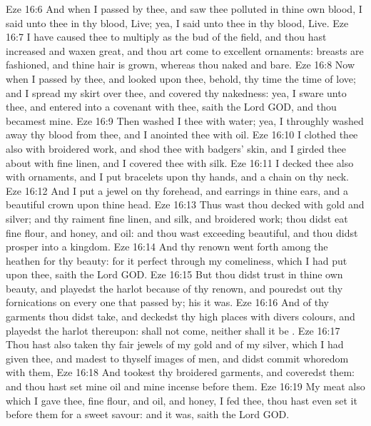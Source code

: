 \vs Eze 16:6 And when I passed by thee, and saw thee polluted in thine own blood, I said unto thee  in thy blood, Live; yea, I said unto thee  in thy blood, Live.
\vs Eze 16:7 I have caused thee to multiply as the bud of the field, and thou hast increased and waxen great, and thou art come to excellent ornaments:  breasts are fashioned, and thine hair is grown, whereas thou  naked and bare.
\vs Eze 16:8 Now when I passed by thee, and looked upon thee, behold, thy time  the time of love; and I spread my skirt over thee, and covered thy nakedness: yea, I sware unto thee, and entered into a covenant with thee, saith the Lord GOD, and thou becamest mine.
\vs Eze 16:9 Then washed I thee with water; yea, I throughly washed away thy blood from thee, and I anointed thee with oil.
\vs Eze 16:10 I clothed thee also with broidered work, and shod thee with badgers' skin, and I girded thee about with fine linen, and I covered thee with silk.
\vs Eze 16:11 I decked thee also with ornaments, and I put bracelets upon thy hands, and a chain on thy neck.
\vs Eze 16:12 And I put a jewel on thy forehead, and earrings in thine ears, and a beautiful crown upon thine head.
\vs Eze 16:13 Thus wast thou decked with gold and silver; and thy raiment  fine linen, and silk, and broidered work; thou didst eat fine flour, and honey, and oil: and thou wast exceeding beautiful, and thou didst prosper into a kingdom.
\vs Eze 16:14 And thy renown went forth among the heathen for thy beauty: for it  perfect through my comeliness, which I had put upon thee, saith the Lord GOD.
\vs Eze 16:15 But thou didst trust in thine own beauty, and playedst the harlot because of thy renown, and pouredst out thy fornications on every one that passed by; his it was.
\vs Eze 16:16 And of thy garments thou didst take, and deckedst thy high places with divers colours, and playedst the harlot thereupon:  shall not come, neither shall it be .
\vs Eze 16:17 Thou hast also taken thy fair jewels of my gold and of my silver, which I had given thee, and madest to thyself images of men, and didst commit whoredom with them,
\vs Eze 16:18 And tookest thy broidered garments, and coveredst them: and thou hast set mine oil and mine incense before them.
\vs Eze 16:19 My meat also which I gave thee, fine flour, and oil, and honey,  I fed thee, thou hast even set it before them for a sweet savour: and  it was, saith the Lord GOD.
